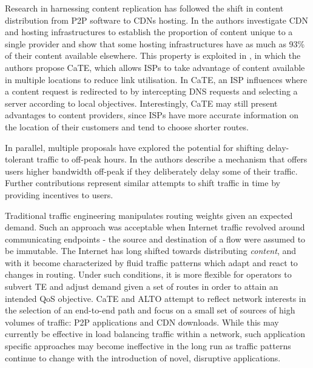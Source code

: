 Research in harnessing content replication has followed the shift in content distribution from \ac{P2P} software to \acp{CDN} hosting.
In \cite{Ager:2011p528} the authors investigate CDN and hosting infrastructures to establish the proportion of content unique to a single provider and show that some hosting infrastructures have as much as 93\% of their content available elsewhere.
This property is exploited in \cite{Poese:2012:ECT:2378956.2378960}, in which the authors propose \ac{CaTE}, which allows \acp{ISP} to take advantage of content available in multiple locations to reduce link utilisation. 
In \ac{CaTE}, an \ac{ISP} influences where a content request is redirected to by intercepting \ac{DNS} requests and selecting a server according to local objectives.
Interestingly, \ac{CaTE} may still present advantages to content providers, since \acp{ISP} have more accurate information on the location of their customers and tend to choose shorter routes.

In parallel, multiple proposals have explored the potential for shifting delay-tolerant traffic to off-peak hours.
In \cite{Laoutaris:2008p534} the authors describe a mechanism that offers users higher bandwidth off-peak if they deliberately delay some of their traffic.
Further contributions \cite{JoeWong:2011p535,Chhabra:2010p536} represent similar attempts to shift traffic in time by providing incentives to users.

Traditional traffic engineering manipulates routing weights given an expected demand.
Such an approach was acceptable when Internet traffic revolved around communicating endpoints - the source and destination of a flow were assumed to be immutable.
The Internet has long shifted towards distributing \emph{content}, and with it become characterized by fluid traffic patterns which adapt and react to changes in routing.
Under such conditions, it is more flexible for operators to subvert \ac{TE} and adjust demand given a set of routes in order to attain an intended \ac{QoS} objective.
\ac{CaTE} and \ac{ALTO} attempt to reflect network interests in the selection of an end-to-end path and focus on a small set of sources of high volumes of traffic: \ac{P2P} applications and \ac{CDN} downloads.
While this may currently be effective in load balancing traffic within a network, such application specific approaches may become ineffective in the long run as traffic patterns continue to change with the introduction of novel, disruptive applications.
